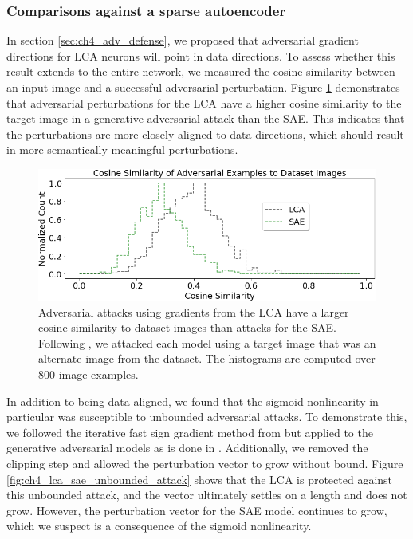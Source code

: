 \subsubsection{Comparisons against a sparse autoencoder}
In section \ref{sec:ch4_adv_defense}, we proposed that adversarial gradient directions for LCA neurons will point in data directions. To assess whether this result extends to the entire network, we measured the cosine similarity between an input image and a successful adversarial perturbation. Figure \ref{fig:ch4_cosine_similarity} demonstrates that adversarial perturbations for the LCA have a higher cosine similarity to the target image in a generative adversarial attack \parencite{kos2018adversarial} than the SAE. This indicates that the perturbations are more closely aligned to data directions, which should result in more semantically meaningful perturbations.

\begin{figure}[h]
    \begin{center}
    \centerline{\includegraphics[width=\columnwidth]{figures/cosyne_similarity.png}}
    \end{center}
    \caption{Adversarial attacks using gradients from the LCA have a larger cosine similarity to dataset images than attacks for the SAE. Following \parencite{kos2018adversarial}, we attacked each model using a target image that was an alternate image from the dataset. The histograms are computed over 800 image examples.}
    \label{fig:ch4_cosine_similarity}
\end{figure}

In addition to being data-aligned, we found that the sigmoid nonlinearity in particular was susceptible to unbounded adversarial attacks. To demonstrate this, we followed the iterative fast sign gradient method from \parencite{kurakin2016adversarial} but applied to the generative adversarial models as is done in \parencite{kos2018adversarial}. Additionally, we removed the clipping step and allowed the perturbation vector to grow without bound. Figure \ref{fig:ch4_lca_sae_unbounded_attack} shows that the LCA is protected against this unbounded attack, and the vector ultimately settles on a length and does not grow. However, the perturbation vector for the SAE model continues to grow, which we suspect is a consequence of the sigmoid nonlinearity.

